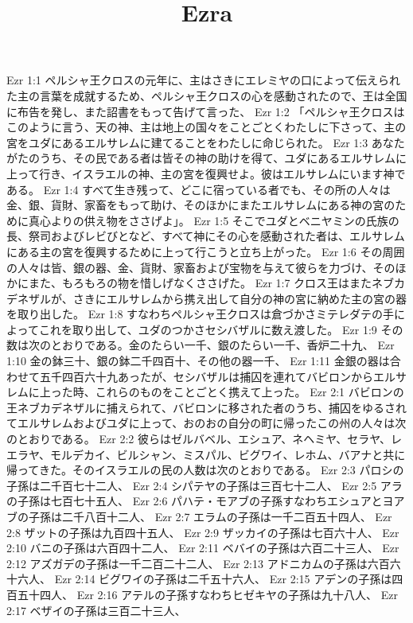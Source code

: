 

\title{Ezra}

Ezr 1:1  ペルシャ王クロスの元年に、主はさきにエレミヤの口によって伝えられた主の言葉を成就するため、ペルシャ王クロスの心を感動されたので、王は全国に布告を発し、また詔書をもって告げて言った、
Ezr 1:2  「ペルシャ王クロスはこのように言う、天の神、主は地上の国々をことごとくわたしに下さって、主の宮をユダにあるエルサレムに建てることをわたしに命じられた。
Ezr 1:3  あなたがたのうち、その民である者は皆その神の助けを得て、ユダにあるエルサレムに上って行き、イスラエルの神、主の宮を復興せよ。彼はエルサレムにいます神である。
Ezr 1:4  すべて生き残って、どこに宿っている者でも、その所の人々は金、銀、貨財、家畜をもって助け、そのほかにまたエルサレムにある神の宮のために真心よりの供え物をささげよ」。
Ezr 1:5  そこでユダとベニヤミンの氏族の長、祭司およびレビびとなど、すべて神にその心を感動された者は、エルサレムにある主の宮を復興するために上って行こうと立ち上がった。
Ezr 1:6  その周囲の人々は皆、銀の器、金、貨財、家畜および宝物を与えて彼らを力づけ、そのほかにまた、もろもろの物を惜しげなくささげた。
Ezr 1:7  クロス王はまたネブカデネザルが、さきにエルサレムから携え出して自分の神の宮に納めた主の宮の器を取り出した。
Ezr 1:8  すなわちペルシャ王クロスは倉づかさミテレダテの手によってこれを取り出して、ユダのつかさセシバザルに数え渡した。
Ezr 1:9  その数は次のとおりである。金のたらい一千、銀のたらい一千、香炉二十九、
Ezr 1:10  金の鉢三十、銀の鉢二千四百十、その他の器一千、
Ezr 1:11  金銀の器は合わせて五千四百六十九あったが、セシバザルは捕囚を連れてバビロンからエルサレムに上った時、これらのものをことごとく携えて上った。
Ezr 2:1  バビロンの王ネブカデネザルに捕えられて、バビロンに移された者のうち、捕囚をゆるされてエルサレムおよびユダに上って、おのおの自分の町に帰ったこの州の人々は次のとおりである。
Ezr 2:2  彼らはゼルバベル、エシュア、ネヘミヤ、セラヤ、レエラヤ、モルデカイ、ビルシャン、ミスパル、ビグワイ、レホム、バアナと共に帰ってきた。そのイスラエルの民の人数は次のとおりである。
Ezr 2:3  パロシの子孫は二千百七十二人、
Ezr 2:4  シパテヤの子孫は三百七十二人、
Ezr 2:5  アラの子孫は七百七十五人、
Ezr 2:6  パハテ・モアブの子孫すなわちエシュアとヨアブの子孫は二千八百十二人、
Ezr 2:7  エラムの子孫は一千二百五十四人、
Ezr 2:8  ザットの子孫は九百四十五人、
Ezr 2:9  ザッカイの子孫は七百六十人、
Ezr 2:10  バニの子孫は六百四十二人、
Ezr 2:11  ベバイの子孫は六百二十三人、
Ezr 2:12  アズガデの子孫は一千二百二十二人、
Ezr 2:13  アドニカムの子孫は六百六十六人、
Ezr 2:14  ビグワイの子孫は二千五十六人、
Ezr 2:15  アデンの子孫は四百五十四人、
Ezr 2:16  アテルの子孫すなわちヒゼキヤの子孫は九十八人、
Ezr 2:17  ベザイの子孫は三百二十三人、
